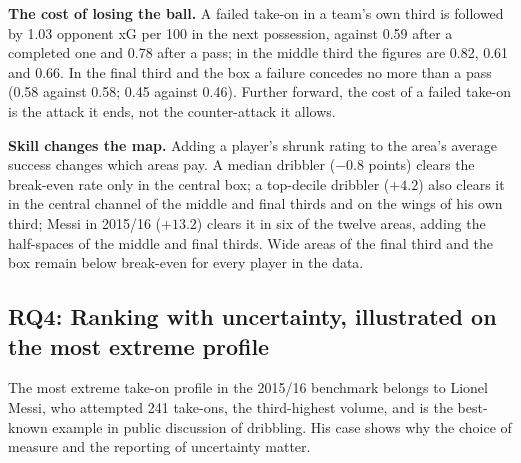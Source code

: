 \documentclass[
  12pt]{article}
\begin{document}
\textbf{The cost of losing the ball.} A failed take-on in a team's own
third is followed by 1.03 opponent xG per 100 in the next possession,
against 0.59 after a completed one and 0.78 after a pass; in the middle
third the figures are 0.82, 0.61 and 0.66. In the final third and the
box a failure concedes no more than a pass (0.58 against 0.58; 0.45
against 0.46). Further forward, the cost of a failed take-on is the
attack it ends, not the counter-attack it allows.

\textbf{Skill changes the map.} Adding a player's shrunk rating to the
area's average success changes which areas pay. A median dribbler
(\(-0.8\) points) clears the break-even rate only in the central box; a
top-decile dribbler (\(+4.2\)) also clears it in the central channel of
the middle and final thirds and on the wings of his own third; Messi in
2015/16 (\(+13.2\)) clears it in six of the twelve areas, adding the
half-spaces of the middle and final thirds. Wide areas of the final
third and the box remain below break-even for every player in the data.

\subsection{RQ4: Ranking with uncertainty, illustrated on the most
extreme profile}\label{sec-case}

The most extreme take-on profile in the 2015/16 benchmark belongs to
Lionel Messi, who attempted 241 take-ons, the third-highest volume, and
is the best-known example in public discussion of dribbling. His case
shows why the choice of measure and the reporting of uncertainty matter.
\end{document}
